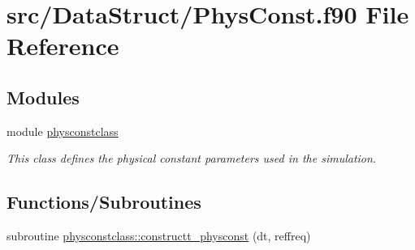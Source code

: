 \hypertarget{_phys_const_8f90}{}\section{src/\+Data\+Struct/\+Phys\+Const.f90 File Reference}
\label{_phys_const_8f90}
\subsection*{Modules}
\begin{DoxyCompactItemize}
\item 
module \mbox{\hyperlink{namespacephysconstclass}{physconstclass}}
\begin{DoxyCompactList}\small\item\em This class defines the physical constant parameters used in the simulation. \end{DoxyCompactList}\end{DoxyCompactItemize}
\subsection*{Functions/\+Subroutines}
\begin{DoxyCompactItemize}
\item 
subroutine \mbox{\hyperlink{namespacephysconstclass_a9363467b39854297442c284c2c9fbe07}{physconstclass\+::constructt\+\_\+physconst}} (dt, reffreq)
\end{DoxyCompactItemize}

